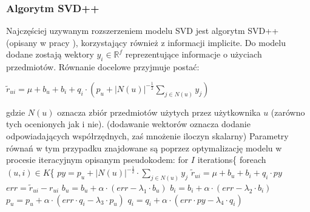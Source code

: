\documentclass{pracamgr}
\begin{document}
    \subsubsection{Algorytm SVD++}
     Najczęściej uzywanym rozszerzeniem modelu SVD jest algorytm SVD++ (opisany w pracy \cite{SVD++}), korzystający również z informacji implicite.
     Do modelu dodane zostają wektory $y_i\in\mathbb{R}^f$ reprezentujące informacje o użyciach przedmiotów.
     Równanie docelowe przyjmuje postać:
     \begin{center}
      $\tilde{r}_{ui}=\mu+b_u+b_i+q_i\cdot\left(p_u +|N(u)|^{-\frac{1}{2}}\sum\limits_{j\in N(u)}y_j\right)$
     \end{center}
     gdzie $N(u)$ oznacza zbiór przedmiotów użytych przez użytkownika $u$ (zarówno tych ocenionych jak i nie).\newline
     {\scriptsize
      (dodawanie wektorów oznacza dodanie odpowiadających współrzędnych, zaś mnożenie iloczyn skalarny)
     }\newline
     Parametry równań w tym przypadku znajdowane są poprzez optymalizację modelu w procesie iteracyjnym opisanym pseudokodem:\newline\newline
    \hspace*{16pt}	for $I$ iterations\{\newline
    \hspace*{32pt}		foreach $(u,i)\in K$\{\newline
    \hspace*{48pt}			$py=p_u +|N(u)|^{-\frac{1}{2}}\cdot\sum\limits_{j\in N(u)}y_j$\newline
    \hspace*{48pt}			$\tilde{r}_{ui}=\mu+b_u+b_i+q_i\cdot py$\newline
    \hspace*{48pt}			$err=\tilde{r}_{ui}-r_{ui}$\newline
    \hspace*{48pt}			$b_u=b_u+\alpha\cdot(err-\lambda_1\cdot b_u)$\newline
    \hspace*{48pt}			$b_i=b_i+\alpha\cdot(err-\lambda_2\cdot b_i)$\newline
    \hspace*{48pt}			$p_u=p_u+\alpha\cdot(err\cdot q_i-\lambda_3\cdot p_u)$\newline
    \hspace*{48pt}			$q_i=q_i+\alpha\cdot(err\cdot py-\lambda_4\cdot q_i)$\newline
\end{document}
